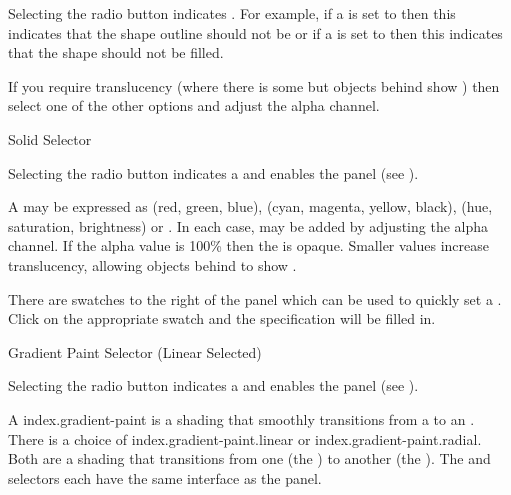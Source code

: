 
Selecting the  radio button indicates
. For example, if a  is set to
 then this indicates that the \gls{shape}
outline should not be  or if a
 is set to  then
this indicates that the \gls{shape} should not be filled.

If you require \gls{translucency} (where there is some 
but \glspl{object} behind show ) then select one of
the other  options and adjust the alpha channel.


{}
{Solid  Selector}

Selecting the  radio button indicates a
  and enables the
 panel (see ). 

A  may be expressed as
 (red, green, blue),
 (cyan, magenta, yellow, black),
 (hue, saturation, brightness) or
. In each case,
 may be added by adjusting
the alpha channel.  If the alpha value is 100\% then the
 is opaque.  Smaller values increase
\gls{translucency}, allowing \glspl{object} behind to show
.

There are swatches to the right of the  panel 
which can be used to quickly set a . Click on the 
appropriate swatch and the  specification will be
filled in.


{}
{Gradient Paint Selector (Linear Selected)}

Selecting the  radio button indicates a 
 and enables the
 panel (see
). 

A \gls{index.gradient-paint} is a shading that smoothly transitions
from a  to an
.  There is a choice
of \gls{index.gradient-paint.linear} or
\gls{index.gradient-paint.radial}. Both are a shading that
transitions from one  (the
) to another (the
).  The
 and  selectors
each have the same interface as the  panel.

